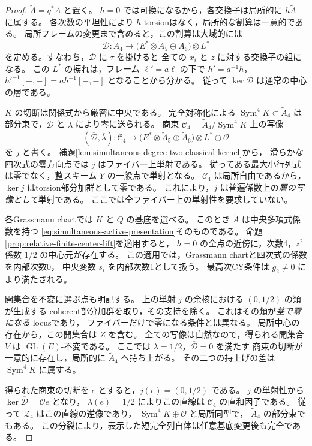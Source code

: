\begin{proof}
$\widetilde A=q^*A$ と置く。
$h=0$ では可換になるから，各交換子は局所的に $h\widetilde A$ に属する。
各次数の平坦性により $h$-torsionはなく，局所的な割算は一意的である。
局所フレームの変更まで含めると，この割算は大域的には
\[
 \mathcal D:\widetilde A_4\longrightarrow
 \bigl(E^*\otimes\widetilde A_5\oplus\widetilde A_6\bigr)\otimes L^*
\]
を定める。すなわち，$\mathcal D$ に $\tau$ を掛けると
全ての $x_i$ と $z$ に対する交換子の組になる。
この $L^*$ の捩れは，フレーム $\ell'=a\ell$ の下で
$h'=a^{-1}h$，$h'^{-1}[-,-]=a h^{-1}[-,-]$ となることから分かる。
従って $\ker\mathcal D$ は通常の中心の層である。

$K$ の切断は関係式から厳密に中央である。
完全対称化による $\operatorname{Sym}^4K\subset\widetilde A_4$ は
部分束で，$\mathcal D$ と $\lambda$ により零に送られる。
商束 $\mathcal C_4=\widetilde A_4/\operatorname{Sym}^4K$ 上の写像
\[
 (\overline{\mathcal D},\overline\lambda):
 \mathcal C_4\longrightarrow
 \bigl(E^*\otimes\widetilde A_5\oplus\widetilde A_6\bigr)\otimes L^*
       \oplus\mathcal O
\]
を $j$ と書く。
補題\ref{lem:simultaneous-degree-two-classical-kernel}から，
滑らかな四次式の零方向点では $j$ はファイバー上単射である。
従ってある最大小行列式は零でなく，整スキーム $Y$ の一般点で単射となる。
$\mathcal C_4$ は局所自由であるから，$\ker j$ はtorsion部分加群として零である。
これにより，$j$ は普遍係数上の\emph{層の写像として}単射である。
ここでは全ファイバー上の単射性を要求していない。

各Grassmann chartでは $K$ と $Q$ の基底を選べる。
このとき $\widetilde A$ は中央多項式係数を持つ
\eqref{eq:simultaneous-active-presentation}そのものである。
命題\ref{prop:relative-finite-center-lift}を適用すると，
$h=0$ の全点の近傍に，次数4，$z^2$ 係数 $1/2$ の中心元が存在する。
この適用では，Grassmann chartと四次式の係数を内部次数0，
中央変数 $s_i$ を内部次数1として扱う。
最高次CY条件は $g_2\ne0$ により満たされる。

開集合を不変に選ぶ点も明記する。
上の単射 $j$ の余核における $(0,1/2)$ の類が生成する
coherent部分加群を取り，その支持を除く。
これはその類が\emph{茎で零になる} locusであり，
ファイバーだけで零になる条件とは異なる。
局所中心の存在から，この開集合は $Z$ を含む。
全ての写像は自然なので，得られる開集合 $V$ は
$\operatorname{GL}(E)$-不変である。
ここでは $\overline\lambda=1/2$，$\overline{\mathcal D}=0$ を満たす
商束の切断が一意的に存在し，局所的に $\widetilde A_4$ へ持ち上がる。
その二つの持上げの差は $\operatorname{Sym}^4K$ に属する。

得られた商束の切断を $e$ とすると，$j(e)=(0,1/2)$ である。
$j$ の単射性から $\ker\overline{\mathcal D}=\mathcal O e$ となり，
$\overline\lambda(e)=1/2$ によりこの直線は $\mathcal C_4$ の直和因子である。
従って $\mathcal Z_4$ はこの直線の逆像であり，
$\operatorname{Sym}^4K\oplus\mathcal O$ と局所同型で，
$\widetilde A_4$ の部分束でもある。
この分裂により，表示した短完全列自体は任意基底変更後も完全である。


\end{proof}
